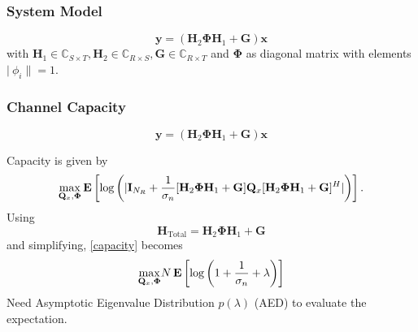 \documentclass[10pt,tgadventor, onlymath]{beamer}
\begin{document}
\begin{frame}
\frametitle{System Model}
\centering
\begin{equation}
	\mathbf{y} = (\mathbf{H}_2\boldsymbol{\Phi}\mathbf{H}_1 + \mathbf{G})\mathbf{x}
\end{equation}
with 
$\mathbf{H}_{1}\in \mathbb{C}_{S \times T},\mathbf{H}_{2} \in \mathbb{C}_{R \times S}, \mathbf{G} \in \mathbb{C}_{R \times T}$ and $\boldsymbol{\Phi}$ as diagonal matrix with elements $|\ \phi_i \| =1 $.
\end{frame}

\begin{frame}
\frametitle{Channel Capacity}
\begin{equation*}
	\mathbf{y} = (\mathbf{H}_2\boldsymbol{\Phi}\mathbf{H}_1 + \mathbf{G})\mathbf{x}
\end{equation*}

Capacity is given by 
\begin{equation}\label{capacity}
\underset{\mathbf{Q}_{x}, \boldsymbol{\Phi} }{\mathrm{max}}
\mathop{\bf E{}}\left[\text{log{}}\left(|\mathbf{I}_{N_R}+\frac{1}{\sigma_n}[\mathbf{H}_{2}\boldsymbol{\Phi}\mathbf{H}_{1} + \mathbf{G}]\mathbf{Q}_x[\mathbf{H}_{2}\boldsymbol{\Phi}\mathbf{H}_{1} + \mathbf{G}]^H|\right)\right].
\end{equation}
Using 
\begin{equation}
\mathbf{H}_{\text{Total}} = \mathbf{H}_{2}\boldsymbol{\Phi}\mathbf{H}_{1} + \mathbf{G}
\end{equation}
and simplifying, \ref{capacity} becomes
\begin{equation}
\underset{\mathbf{Q}_{x}, \boldsymbol{\Phi} }{\mathrm{max}}
N\mathop{\bf E{}}\left[\text{log{}}\left(1+\frac{1}{\sigma_n} + \lambda\right)\right]
\end{equation}
Need Asymptotic Eigenvalue Distribution $p(\lambda)$ (AED) to evaluate the expectation.
\end{frame}
\end{document}
